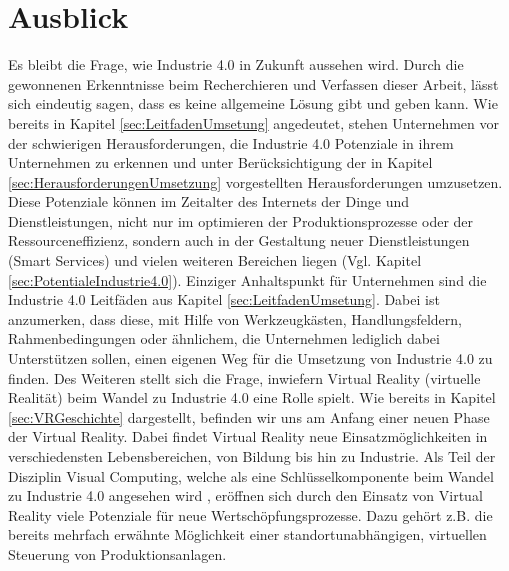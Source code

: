 \section{Ausblick}\label{sec:Ausblick}
Es bleibt die Frage, wie Industrie 4.0 in Zukunft aussehen wird. Durch die gewonnenen Erkenntnisse beim Recherchieren und Verfassen dieser Arbeit, lässt sich eindeutig sagen, dass es keine allgemeine Lösung gibt und geben kann. Wie bereits in Kapitel \ref{sec:LeitfadenUmsetung} angedeutet, stehen Unternehmen vor der schwierigen Herausforderungen, die Industrie 4.0 Potenziale in ihrem Unternehmen zu erkennen und unter Berücksichtigung der in Kapitel \ref{sec:HerausforderungenUmsetzung} vorgestellten Herausforderungen umzusetzen. Diese Potenziale können im Zeitalter des Internets der Dinge und Dienstleistungen, nicht nur im optimieren der Produktionsprozesse oder der Ressourceneffizienz, sondern auch in der Gestaltung neuer Dienstleistungen (Smart Services) und vielen weiteren Bereichen liegen (Vgl. Kapitel \ref{sec:PotentialeIndustrie4.0}). 
Einziger Anhaltspunkt für Unternehmen sind die Industrie 4.0 Leitfäden aus Kapitel \ref{sec:LeitfadenUmsetung}. Dabei ist anzumerken, dass diese, mit Hilfe von Werkzeugkästen, Handlungsfeldern, Rahmenbedingungen oder ähnlichem, die Unternehmen lediglich dabei Unterstützen sollen, einen eigenen Weg für die Umsetzung von Industrie 4.0 zu finden.
\newline
Des Weiteren stellt sich die Frage, inwiefern Virtual Reality (virtuelle Realität) beim Wandel zu Industrie 4.0 eine Rolle spielt. Wie bereits in Kapitel \ref{sec:VRGeschichte} dargestellt, befinden wir uns am Anfang einer neuen Phase der Virtual Reality. Dabei findet Virtual Reality neue Einsatzmöglichkeiten in verschiedensten Lebensbereichen, von Bildung bis hin zu Industrie. Als Teil der Disziplin Visual Computing, welche als eine Schlüsselkomponente beim Wandel zu Industrie 4.0 angesehen wird \cite[S.1]{17}, eröffnen sich durch den Einsatz von Virtual Reality viele Potenziale für neue Wertschöpfungsprozesse. Dazu gehört z.B. die bereits mehrfach erwähnte Möglichkeit einer standortunabhängigen, virtuellen Steuerung von Produktionsanlagen.


